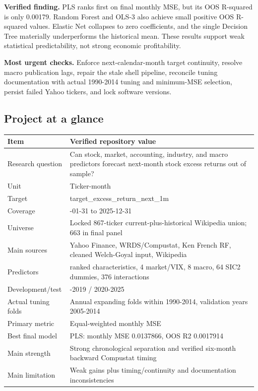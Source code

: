 \documentclass[
  11pt,
  a4paper]{article}
\newcounter{none} %
\begin{document}
\textbf{Verified finding.} PLS ranks first on final monthly MSE, but its
OOS R-squared is only 0.00179. Random Forest and OLS-3 also achieve
small positive OOS R-squared values. Elastic Net collapses to zero
coefficients, and the single Decision Tree materially underperforms the
historical mean. These results support weak statistical predictability,
not strong economic profitability.

\textbf{Most urgent checks.} Enforce next-calendar-month target
continuity, resolve macro publication lags, repair the stale shell
pipeline, reconcile tuning documentation with actual 1990-2014 tuning
and minimum-MSE selection, persist failed Yahoo tickers, and lock
software versions.

\subsection{Project at a glance}\label{sec-at-glance}

{\def\LTcaptype{none} %
\begin{longtable}[]{@{}
  >{\raggedright\arraybackslash}p{}
  >{\raggedright\arraybackslash}p{}@{}}
\toprule\noalign{}
\begin{minipage}[b]{\linewidth}\raggedright
Item
\end{minipage} & \begin{minipage}[b]{\linewidth}\raggedright
Verified repository value
\end{minipage} \\
\midrule\noalign{}
\endhead
\bottomrule\noalign{}
\endlastfoot
Research question & Can stock, market, accounting, industry, and macro
predictors forecast next-month stock excess returns out of sample? \\
Unit & Ticker-month \\
Target & target\_\allowbreak{}excess\_\allowbreak{}return\_\allowbreak{}next\_\allowbreak{}1m \\
Coverage & 1990-01-31 to 2025-12-31 \\
Universe & Locked 867-ticker current-plus-historical Wikipedia union;
663 in final panel \\
Main sources & Yahoo Finance, WRDS/Compustat, Ken French RF, cleaned
Welch-Goyal input, Wikipedia \\
Predictors & 47 ranked characteristics, 4 market/VIX, 8 macro, 64 SIC2
dummies, 376 interactions \\
Development/test & 1990-2019 / 2020-2025 \\
Actual tuning folds & Annual expanding folds within 1990-2014,
validation years 2005-2014 \\
Primary metric & Equal-weighted monthly MSE \\
Best final model & PLS: monthly MSE 0.0137866, OOS R2 0.0017914 \\
Main strength & Strong chronological separation and verified six-month
backward Compustat timing \\
Main limitation & Weak gains plus timing/continuity and documentation
inconsistencies \\
\end{longtable}
}
\end{document}
